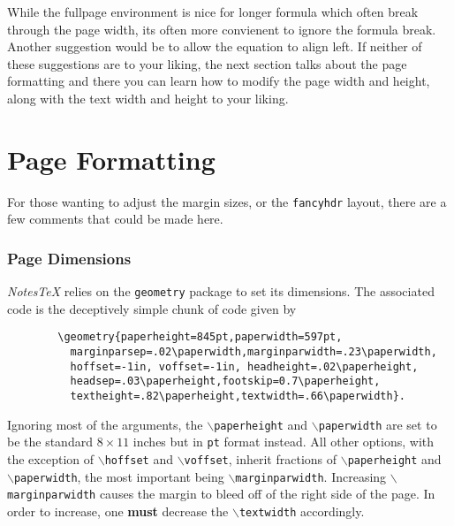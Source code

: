 \documentclass[10pt]{article}
\begin{document}
	While the fullpage environment is nice for longer formula which often break through the page width, its often more convienent to ignore the formula break. Another suggestion would be to allow the equation to align left. If neither of these suggestions are to your liking, the next section talks about the page formatting and there you can learn how to modify the page width and height, along with the text width and height to your liking.

	\newpage

	\part{Page Formatting}
	For those wanting to adjust the margin sizes, or the \texttt{fancyhdr} layout, there are a few comments that could be made here.
	\section{Page Dimensions}
	\textit{NotesTeX} relies on the \texttt{geometry} package to set its dimensions. The associated code is the deceptively simple chunk of code given by
	\begin{verbatim}
		\geometry{paperheight=845pt,paperwidth=597pt,
          marginparsep=.02\paperwidth,marginparwidth=.23\paperwidth,
          hoffset=-1in, voffset=-1in, headheight=.02\paperheight,
          headsep=.03\paperheight,footskip=0.7\paperheight,
          textheight=.82\paperheight,textwidth=.66\paperwidth}.
	\end{verbatim}
	Ignoring most of the arguments, the \texttt{$\backslash$paperheight} and \texttt{$\backslash$paperwidth} are set to be the standard $8\times11$ inches but in \texttt{pt} format instead. All other options, with the exception of \texttt{$\backslash$hoffset} and \texttt{$\backslash$voffset}, inherit fractions of \texttt{$\backslash$paperheight} and \texttt{$\backslash$paperwidth}, the most important being \texttt{$\backslash$marginparwidth}. Increasing \texttt{$\backslash$marginparwidth} causes the margin to bleed off of the right side of the page. In order to increase, one \textbf{must} decrease the \texttt{$\backslash$textwidth} accordingly.
\end{document}
